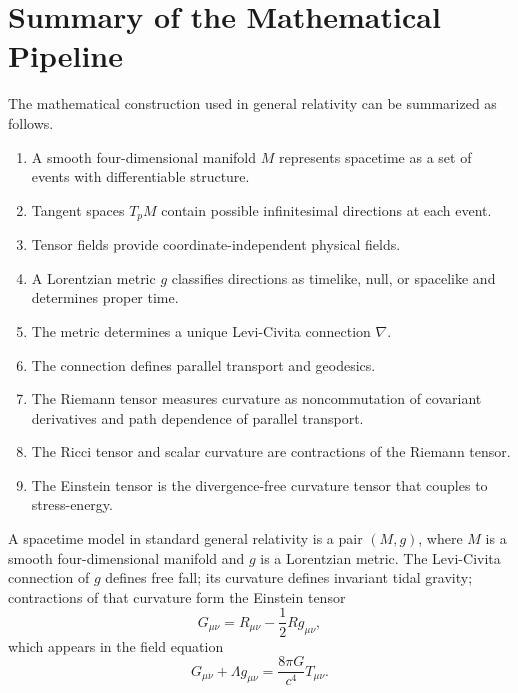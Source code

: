 \clearpage

\section{Summary of the Mathematical Pipeline}

The mathematical construction used in general relativity can be summarized as
follows.

\begin{enumerate}
    \item A smooth four-dimensional manifold \(M\) represents spacetime as a set
    of events with differentiable structure.
    \item Tangent spaces \(T_pM\) contain possible infinitesimal directions at
    each event.
    \item Tensor fields provide coordinate-independent physical fields.
    \item A Lorentzian metric \(g\) classifies directions as timelike, null, or
    spacelike and determines proper time.
    \item The metric determines a unique Levi-Civita connection \(\nabla\).
    \item The connection defines parallel transport and geodesics.
    \item The Riemann tensor measures curvature as noncommutation of covariant
    derivatives and path dependence of parallel transport.
    \item The Ricci tensor and scalar curvature are contractions of the Riemann
    tensor.
    \item The Einstein tensor is the divergence-free curvature tensor that
    couples to stress-energy.
\end{enumerate}

\begin{summarybox}
A spacetime model in standard general relativity is a pair \((M,g)\), where
\(M\) is a smooth four-dimensional manifold and \(g\) is a Lorentzian metric.
The Levi-Civita connection of \(g\) defines free fall; its curvature defines
invariant tidal gravity; contractions of that curvature form the Einstein tensor
\[
G_{\mu\nu}=R_{\mu\nu}-\frac{1}{2}Rg_{\mu\nu},
\]
which appears in the field equation
\[
G_{\mu\nu}+\Lambda g_{\mu\nu}=\frac{8\pi G}{c^4}T_{\mu\nu}.
\]
\end{summarybox}
